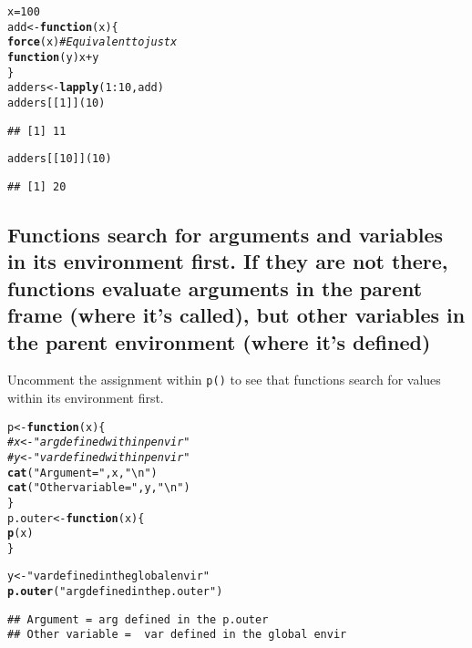 \documentclass{article}\usepackage[]{graphicx}\usepackage[]{color}
\makeatletter
\newcommand{\hlnum}[1]{\textcolor[rgb]{0.686,0.059,0.569}{#1}}%
\newcommand{\hlstr}[1]{\textcolor[rgb]{0.192,0.494,0.8}{#1}}%
\newcommand{\hlcom}[1]{\textcolor[rgb]{0.678,0.584,0.686}{\textit{#1}}}%
\newcommand{\hlopt}[1]{\textcolor[rgb]{0,0,0}{#1}}%
\newcommand{\hlstd}[1]{\textcolor[rgb]{0.345,0.345,0.345}{#1}}%
\newcommand{\hlkwa}[1]{\textcolor[rgb]{0.161,0.373,0.58}{\textbf{#1}}}%
\newcommand{\hlkwb}[1]{\textcolor[rgb]{0.69,0.353,0.396}{#1}}%
\newcommand{\hlkwc}[1]{\textcolor[rgb]{0.333,0.667,0.333}{#1}}%
\newcommand{\hlkwd}[1]{\textcolor[rgb]{0.737,0.353,0.396}{\textbf{#1}}}%
\newenvironment{kframe}{%
 \def\at@end@of@kframe{}%
 \ifinner\ifhmode%
  \def\at@end@of@kframe{\end{minipage}}%
  \begin{minipage}{\columnwidth}%
 \fi\fi%
 \def\FrameCommand##1{\hskip\@totalleftmargin \hskip-\fboxsep
 \colorbox{shadecolor}{##1}\hskip-\fboxsep
     \hskip-\linewidth \hskip-\@totalleftmargin \hskip\columnwidth}%
 \MakeFramed {\advance\hsize-\width
   \@totalleftmargin\z@ \linewidth\hsize
   \@setminipage}}%
 {\par\unskip\endMakeFramed%
 \at@end@of@kframe}
\newenvironment{knitrout}{}{} %
\makeatother
\begin{document}
\begin{knitrout}
\color{fgcolor}\begin{kframe}
\begin{alltt}
\hlstd{x} \hlkwb{=} \hlnum{100}
\hlstd{add} \hlkwb{<-} \hlkwa{function}\hlstd{(}\hlkwc{x}\hlstd{) \{}
  \hlkwd{force}\hlstd{(x)} \hlcom{# Equivalent to just x}
  \hlkwa{function}\hlstd{(}\hlkwc{y}\hlstd{) x} \hlopt{+} \hlstd{y}
\hlstd{\}}
\hlstd{adders} \hlkwb{<-} \hlkwd{lapply}\hlstd{(}\hlnum{1}\hlopt{:}\hlnum{10}\hlstd{, add)}
\hlstd{adders[[}\hlnum{1}\hlstd{]](}\hlnum{10}\hlstd{)}
\end{alltt}
\begin{verbatim}
## [1] 11
\end{verbatim}
\begin{alltt}
\hlstd{adders[[}\hlnum{10}\hlstd{]](}\hlnum{10}\hlstd{)}
\end{alltt}
\begin{verbatim}
## [1] 20
\end{verbatim}
\end{kframe}
\end{knitrout}

\subsection{Functions search for arguments and variables in its environment first. If they are not there, functions evaluate arguments in the parent frame (where it's called), but other variables in the parent environment (where it's defined)}

Uncomment the assignment within \verb`p()` to see that functions search for values within its environment first.

\begin{knitrout}
\color{fgcolor}\begin{kframe}
\begin{alltt}
\hlstd{p} \hlkwb{<-} \hlkwa{function}\hlstd{(}\hlkwc{x}\hlstd{) \{}
  \hlcom{# x <- "arg defined within p envir"}
  \hlcom{# y <- "var defined within p envir"}
  \hlkwd{cat}\hlstd{(}\hlstr{"Argument ="}\hlstd{, x,} \hlstr{"\textbackslash{}n"}\hlstd{)}
  \hlkwd{cat}\hlstd{(}\hlstr{"Other variable = "}\hlstd{, y,} \hlstr{"\textbackslash{}n"}\hlstd{)}
\hlstd{\}}
\hlstd{p.outer} \hlkwb{<-} \hlkwa{function}\hlstd{(}\hlkwc{x}\hlstd{) \{}
  \hlkwd{p}\hlstd{(x)}
\hlstd{\}}

\hlstd{y} \hlkwb{<-} \hlstr{"var defined in the global envir"}
\hlkwd{p.outer}\hlstd{(}\hlstr{"arg defined in the p.outer"}\hlstd{)}
\end{alltt}
\begin{verbatim}
## Argument = arg defined in the p.outer 
## Other variable =  var defined in the global envir
\end{verbatim}
\end{kframe}
\end{knitrout}
\end{document}
